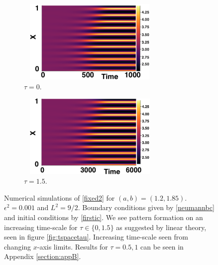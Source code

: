 \begin{figure}[H]
    \centering
    \begin{subfigure}[t]{0.45\textwidth}
        \centering
        \includegraphics[width=7cm,height=4cm]{p2t0.png}
        \caption{$\tau=0$.}
        \label{}
    \end{subfigure}
    \hfill
    \begin{subfigure}[t]{0.45\textwidth}
        \centering
        \includegraphics[width=7cm,height=4cm]{p2t15.png}
        \caption{$\tau=1.5$.}
        \label{}
    \end{subfigure}
    \caption{Numerical simulations of \eqref{fixed2} for $(a,b)=(1.2,1.85)$. $\epsilon^2=0.001$ and $L^2=9/2$. Boundary conditions given by \eqref{neumannbc} and initial conditions by \eqref{firstic}. We see pattern formation on an increasing time-scale for $\tau\in\{0,1.5\}$ as suggested by linear theory, seen in figure \ref{fig:tspacetau}. Increasing time-scale seen from changing $x$-axis limits. Results for $\tau=0.5,1$ can be seen in Appendix \ref{section:appB}.}
    \label{fig:testturing3}
\end{figure}

